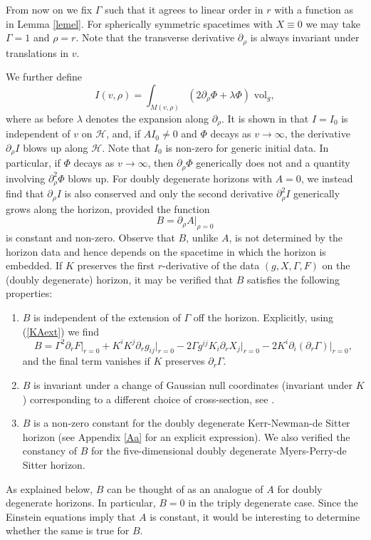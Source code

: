 \documentclass[11pt, reqno]{amsart}
\theoremstyle{plain}
\theoremstyle{definition}
\numberwithin{equation}{section}
\begin{document}
From now on we fix $\Gamma$ such that it agrees to linear order in $r$ with a function as in Lemma \ref{lemel}. For spherically symmetric spacetimes with $X \equiv 0$ we may take $\Gamma = 1$ and $\rho = r$. Note that the transverse derivative $\partial_\rho$ is always invariant under translations in $v$.

We further define
\begin{equation} \label{I}
    I(v,\rho) = \int_{M(v,\rho)}(2\partial_\rho \Phi + \lambda\Phi)\text{ vol}_g,
\end{equation}
where as before $\lambda$ denotes the expansion along $\partial_\rho$. It is shown in \cite{LR12} that $I = I_0$ is independent of $v$ on $\mathcal{H}$, and, if $AI_0 \neq0$ and $\Phi$ decays as $v \to \infty$, the derivative $\partial_\rho I$ blows up along $\mathcal{H}$. Note that $I_0$ is non-zero for generic initial data. In particular, if $\Phi$ decays as $v \to \infty$, then $\partial_\rho \Phi$ generically does not and a quantity involving $\partial_\rho^2\Phi$ blows up. For doubly degenerate horizons with $A = 0$, we instead find that $\partial_\rho I$ is also conserved and only the second derivative $\partial_\rho^2 I$ generically grows along the horizon, provided the function 
\begin{equation}
    B = \partial_\rho A \vert_{\rho = 0}
\end{equation}
is constant and non-zero. Observe that $B$, unlike $A$, is not determined by the horizon data and hence depends on the spacetime in which the horizon is embedded. If $K$ preserves the first $r$-derivative of the data $(g,X,\Gamma,F)$ on the (doubly degenerate) horizon, it may be verified that $B$ satisfies the following properties:
\begin{enumerate}
    \item $B$ is independent of the extension of $\Gamma$ off the horizon. Explicitly, using (\ref{KAext}) we find
    \begin{equation*}
        B = \Gamma^2 \partial_rF\vert_{r=0} + K^iK^j\partial_rg_{ij}\vert_{r = 0} - 2\Gamma g^{ij}K_i\partial_r X_j\vert_{r =0} - 2K^i\partial_i(\partial_r\Gamma)\vert_{r = 0},
        \end{equation*}
        and the final term vanishes if $K$ preserves $\partial_r\Gamma$.
    \item $B$ is invariant under a change of Gaussian null coordinates (invariant under $K$) corresponding to a different choice of cross-section, see \cite[Equation 16]{LL15}.
    \item $B$ is a non-zero constant for the doubly degenerate Kerr-Newman-de Sitter horizon (see Appendix \ref{Aa} for an explicit expression). We also verified the constancy of $B$ for the five-dimensional doubly degenerate Myers-Perry-de Sitter horizon.
\end{enumerate}
As explained below, $B$ can be thought of as an analogue of $A$ for doubly degenerate horizons. In particular, $B = 0$ in the triply degenerate case. Since the Einstein equations imply that $A$ is constant, it would be interesting to determine whether the same is true for $B$. \\
\end{document}

